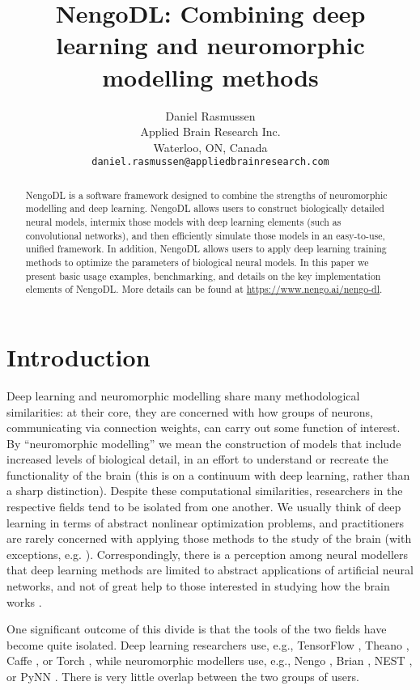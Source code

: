\documentclass{article}
\title{NengoDL: Combining deep learning and neuromorphic modelling methods}
\author{
Daniel Rasmussen \\
Applied Brain Research Inc.\\
Waterloo, ON, Canada \\
\texttt{daniel.rasmussen@appliedbrainresearch.com}
}
\begin{document}
\maketitle

\begin{abstract}
NengoDL is a software framework designed to combine the strengths of neuromorphic modelling and deep learning.  NengoDL allows users to construct biologically detailed neural models, intermix those models with deep learning elements (such as convolutional networks), and then efficiently simulate those models in an easy-to-use, unified framework.  In addition, NengoDL allows users to apply deep learning training methods to optimize the parameters of biological neural models.  In this paper we present basic usage examples, benchmarking, and details on the key implementation elements of NengoDL.  More details can be found at \url{https://www.nengo.ai/nengo-dl}.
\end{abstract}

\section{Introduction}

Deep learning and neuromorphic modelling share many methodological similarities: at their core, they are concerned with how groups of neurons, communicating via connection weights, can carry out some function of interest.  By ``neuromorphic modelling'' we mean the construction of models that include increased levels of biological detail, in an effort to understand or recreate the functionality of the brain (this is on a continuum with deep learning, rather than a sharp distinction).  Despite these computational similarities, researchers in the respective fields tend to be isolated from one another.  We usually think of deep learning in terms of abstract nonlinear optimization problems, and practitioners are rarely concerned with applying those methods to the study of the brain (with exceptions, e.g. \citealt{Kriegeskorte2015,Yamins2016}).  Correspondingly, there is a perception among neural modellers that deep learning methods are limited to abstract applications of artificial neural networks, and not of great help to those interested in studying how the brain works \citep{Kay2017}.

One significant outcome of this divide is that the tools of the two fields have become quite isolated.  Deep learning researchers use, e.g., TensorFlow \citep{Abadi2016}, Theano \citep{Team2016}, Caffe \citep{Jia2014}, or Torch \citep{Collobert2011}, while neuromorphic modellers use, e.g., Nengo \citep{Bekolay2014}, Brian \citep{Stimberg2013}, NEST \citep{Gewaltig2007}, or PyNN \citep{Davison2009}. There is very little overlap between the two groups of users.
\end{document}
